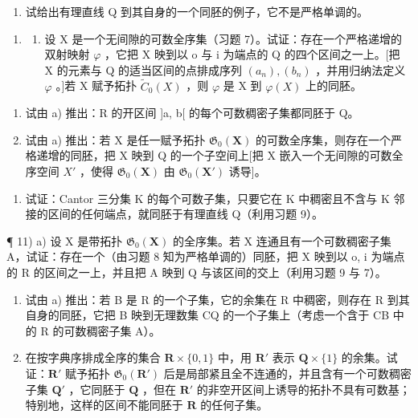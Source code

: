 \begin{enumerate}
\def\labelenumi{\alph{enumi})}
\setcounter{enumi}{1}
\tightlist
\item
试给出有理直线 Q 到其自身的一个同胚的例子，它不是严格单调的。
\end{enumerate}

\begin{enumerate}
\def\labelenumi{\arabic{enumi})}
\setcounter{enumi}{8}
\tightlist
\item
  \begin{enumerate}
  \def\labelenumii{\alph{enumii})}
  \tightlist
  \item
设 X 是一个无间隙的可数全序集（习题 7）。试证：存在一个严格递增的双射映射 \(\varphi\) ，它把 X 映到以 o 与 i 为端点的 Q 的四个区间之一上。{[}把 X 的元素与 Q 的适当区间的点排成序列 \((a_n), (b_n)\) ，并用归纳法定义 \(\varphi\) 。{]}若 X 赋予拓扑 \(\tilde{C}_0(X)\) ，则 \(\varphi\) 是 X 到 \(\varphi(X)\) 上的同胚。
  \end{enumerate}
\end{enumerate}

\begin{enumerate}
\def\labelenumi{\alph{enumi})}
\setcounter{enumi}{1}
\item
试由 a) 推出：R 的开区间 {]}a, b{[} 的每个可数稠密子集都同胚于 Q。
\item
试由 a) 推出：若 X 是任一赋予拓扑 \(\mathfrak{G}_{0}(\mathbf{X})\) 的可数全序集，则存在一个严格递增的同胚，把 X 映到 Q 的一个子空间上{[}把 X 嵌入一个无间隙的可数全序空间 \(X'\) ，使得 \(\mathfrak{G}_{0}(\mathbf{X})\) 由 \(\mathfrak{G}_{0}(\mathbf{X}')\) 诱导{]}。
\end{enumerate}

\begin{enumerate}
\def\labelenumi{\arabic{enumi})}
\setcounter{enumi}{9}
\tightlist
\item
试证：Cantor 三分集 K 的每个可数子集，只要它在 K 中稠密且不含与 K 邻接的区间的任何端点，就同胚于有理直线 Q（利用习题 9）。
\end{enumerate}

¶ 11) a) 设 X 是带拓扑 \(\mathfrak{G}_{0}(\mathbf{X})\) 的全序集。若 X 连通且有一个可数稠密子集 A，试证：存在一个（由习题 8 知为严格单调的）同胚，把 X 映到以 o, i 为端点的 R 的区间之一上，并且把 A 映到 Q 与该区间的交上（利用习题 9 与 7）。

\begin{enumerate}
\def\labelenumi{\alph{enumi})}
\setcounter{enumi}{1}
\item
试由 a) 推出：若 B 是 R 的一个子集，它的余集在 R 中稠密，则存在 R 到其自身的同胚，它把 B 映到无理数集 CQ 的一个子集上（考虑一个含于 CB 中的 R 的可数稠密子集 A）。
\item
在按字典序排成全序的集合 \(\mathbf{R} \times \{0, 1\}\) 中，用 \(\mathbf{R}'\) 表示 \(\mathbf{Q} \times \{1\}\) 的余集。试证：\(\mathbf{R}'\) 赋予拓扑 \(\mathfrak{G}_0(\mathbf{R}')\) 后是局部紧且全不连通的，并且含有一个可数稠密子集 \(\mathbf{Q}'\) ，它同胚于 \(\mathbf{Q}\) ，但在 \(\mathbf{R}'\) 的非空开区间上诱导的拓扑不具有可数基；特别地，这样的区间不能同胚于 \(\mathbf{R}\) 的任何子集。
\end{enumerate}


